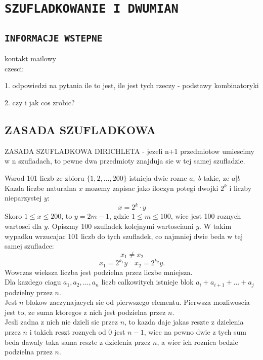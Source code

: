 \documentclass{article}
\begin{document}
\pagecolor{back}\color{txt}\ttfamily

\section*{\color{tit}\texttt{SZUFLADKOWANIE I DWUMIAN}}
\subsection*{\color{tit}\texttt{INFORMACJE WSTEPNE}}
  kontakt mailowy\\
  \color{def}czesci:\color{txt}\par
    1. odpowiedzi na pytania ile to jest, ile jest tych rzeczy - podstawy kombinatoryki\par
    2. czy i jak cos zrobic?
\subsection*{\color{tit}ZASADA SZUFLADKOWA}
  \begin{center}
    \color{def}ZASADA SZUFLADKOWA DIRICHLETA - \color{txt}jezeli n+1 przedmiotow umiescimy \\w n szufladach, to pewne dwa przedmioty znajduja sie w tej samej szufladzie.
  \end{center}
  \color{acc}Wsrod 101 liczb ze zbioru $\{1, 2, ..., 200\}$ istnieja dwie rozne $a,\; b$ takie, ze $a|b$\color{txt}\\
  Kazda liczbe naturalna $x$ mozemy zapisac jako iloczyn potegi dwojki $2^k$ i liczby nieparzystej $y$:
  $$x=2^k\cdot y$$
  Skoro $1\leq x\leq200$, to $y=2m-1$, gdzie $1\leq m\leq100$, wiec jest 100 roznych wartosci dla $y$. Opiszmy 100 szufladek kolejnymi wartosciami $y$. W takim wypadku wrzucajac 101 liczb do tych szufladek, co najmniej dwie beda w tej samej szufladce:
  $$x_1\neq x_2$$ $$x_1=2^{k_1}y\quad x_2=2^{k_2}y.$$
  Wowczas wieksza liczba jest podzielna przez liczbe mniejsza.\medskip\\
  \color{acc}Dla kazdego ciagu $a_1, a_2,...,a_n$ liczb calkowitych istnieje blok $a_i+a_{i+1}+...+a_j$ podzielny przez $n$.\color{txt}\\
  Jest $n$ blokow zaczynajacych sie od pierwszego elementu. Pierwsza mozliwoscia jest to, ze suma ktoregos z nich jest podzielna przez $n$.\\
  Jesli zadna z nich nie dzieli sie przez $n$, to kazda daje jakas reszte z dzielenia przez $n$ i takich reszt roznych od 0 jest $n-1$, wiec na pewno dwie z tych sum beda dawaly taka sama reszte z dzielenia przez $n$, a wiec ich roznica bedzie podzielna przez $n$.
\end{document}
